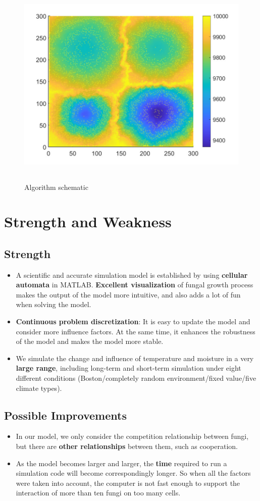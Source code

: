 \documentclass{mcmthesis}
\begin{document}
\begin{figure}[H] 
	\centering 
	\includegraphics[height=10cm]{./T5Figure/K4N1/K4N1L.pdf}
	\caption{Algorithm schematic}
\end{figure}

\newpage
\section{Strength and Weakness}
\subsection{Strength}
\begin{itemize}
	\item A scientific and accurate simulation model is established by using \textbf{cellular automata} in MATLAB. \textbf{Excellent visualization} of fungal growth process makes the output of the model more intuitive, and also adds a lot of fun when solving the model.
	\item \textbf{Continuous problem discretization}: It is easy to update the model and consider more influence factors. At the same time, it enhances the robustness of the model and makes the model more stable.
	\item We simulate the change and influence of temperature and moisture in a very \textbf{large range}, including long-term and short-term simulation under eight different conditions (Boston/completely random environment/fixed value/five climate types).
\end{itemize} 
\subsection{Possible Improvements}
\begin{itemize}
	\item In our model, we only consider the competition relationship between fungi, but there are \textbf{other relationships} between them, such as cooperation.
	\item As the model becomes larger and larger, the \textbf{time} required to run a simulation code will become correspondingly longer. So when all the factors were taken into account, the computer is not fast enough to support the interaction of more than ten fungi on too many cells.
\end{itemize}
\end{document}
